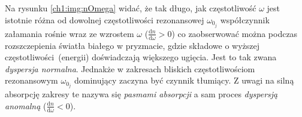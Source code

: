 Na rysunku \ref{ch1:img:nOmega} widać, że tak długo, jak częstotliwość $\omega$ jest istotnie różna od dowolnej częstotliwości rezonansowej $\omega_{0_j}$ współczynnik załamania rośnie wraz ze wzrostem $\omega$ ($\frac{\mathrm{d}n}{\mathrm{d}\omega} > 0$) co zaobserwować można podczas rozszczepienia światła białego w pryzmacie, gdzie składowe o wyższej częstotliwości~(energii) doświadczają większego ugięcia. Jest to tak zwana \textit{dyspersja normalna}. Jednakże w zakresach bliskich częstotliwościom rezonansowym $\omega_{0_j}$ dominujący zaczyna być czynnik tłumiący. Z uwagi na silną absorpcję zakresy te nazywa się \textit{pasmami absorpcji} a sam proces \textit{dyspersją anomalną} ($\frac{\mathrm{d}n}{\mathrm{d}\omega} < 0$).

